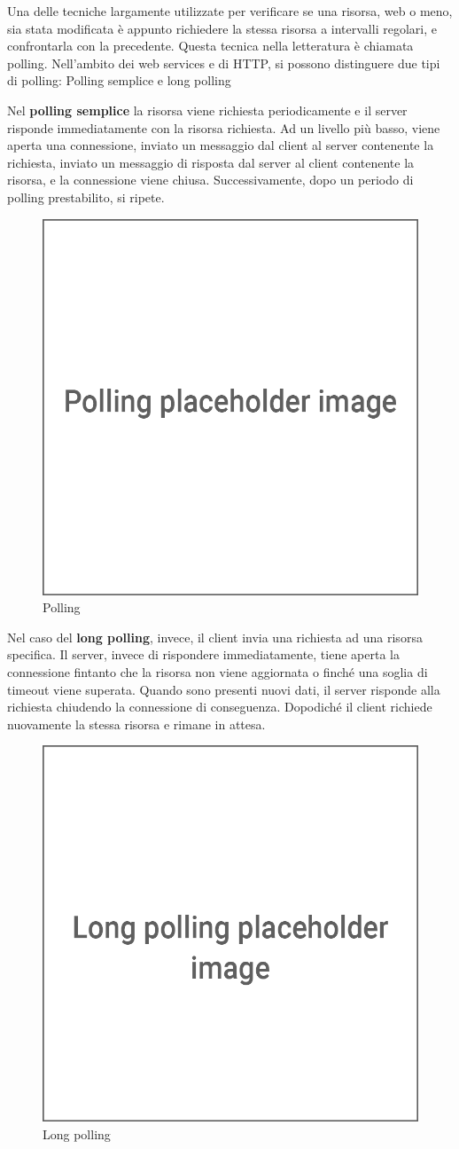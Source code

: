 \documentclass[12pt,a4paper,openright]{report}
\begin{document}
Una delle tecniche largamente utilizzate per verificare se una risorsa, web o meno, sia stata modificata è appunto richiedere la stessa risorsa a intervalli regolari, e confrontarla con la precedente. Questa tecnica nella letteratura è chiamata polling. Nell’ambito dei web services e di HTTP, si possono distinguere due tipi di polling: Polling semplice e long polling
\begin{description}
\item Nel \textbf{polling semplice} la risorsa viene richiesta periodicamente e il server risponde immediatamente con la risorsa richiesta. Ad un livello più basso, viene aperta una connessione, inviato un messaggio dal client al server contenente la richiesta, inviato un messaggio di risposta dal server al client contenente la risorsa, e la connessione viene chiusa. Successivamente, dopo un periodo di polling prestabilito, si ripete.

\begin{figure}[htbp]
\centering
\includegraphics[width=.5\textwidth]{assets/polling.png}
\caption{Polling}
\end{figure}

\item Nel caso del \textbf{long polling}, invece, il client invia una richiesta ad una risorsa specifica. Il server, invece di rispondere immediatamente, tiene aperta la connessione fintanto che la risorsa non viene aggiornata o finché una soglia di timeout viene superata. Quando sono presenti nuovi dati, il server risponde alla richiesta chiudendo la connessione di conseguenza. Dopodiché il client richiede nuovamente la stessa risorsa e rimane in attesa.

\begin{figure}[htbp]
\centering
\includegraphics[width=.5\textwidth]{assets/long_polling.png}
\caption{Long polling}
\end{figure}


\end{description}
\end{document}
